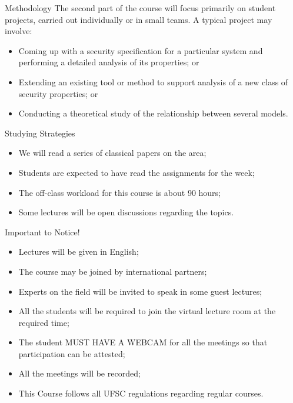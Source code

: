 \documentclass[12pt]{beamer}
\begin{document}
\begin{frame}{Methodology}
The second part of the course will focus primarily on student projects, carried out individually or in small teams. A typical project may involve:\pause
\begin{itemize}
\item Coming up with a security specification for a particular system and performing a detailed analysis of its properties; or\pause
\item Extending an existing tool or method to support analysis of a new class of security properties; or\pause
\item Conducting a theoretical study of the relationship between several models.
\end{itemize}
\end{frame}

\begin{frame}{Studying Strategies}
\begin{itemize}
\item We will read a series of classical papers on the area;\pause
\item Students are expected to have read the assignments for the week;\pause
\item The off-class workload for this course is about 90 hours;\pause
\item Some lectures will be open discussions regarding the topics.
\end{itemize}
\end{frame}

\begin{frame}{Important to Notice!}
\begin{itemize}
\item Lectures will be given in English;\pause
\item The course may be joined by international partners;\pause
\item Experts on the field will be invited to speak in some guest lectures;\pause
\item All the students will be required to join the virtual lecture room at the required time;\pause
\item The student MUST HAVE A WEBCAM for all the meetings so that participation can be attested;\pause
\item All the meetings will be recorded;\pause
\item This Course follows all UFSC regulations regarding regular courses.
\end{itemize}
\end{frame}
\end{document}
